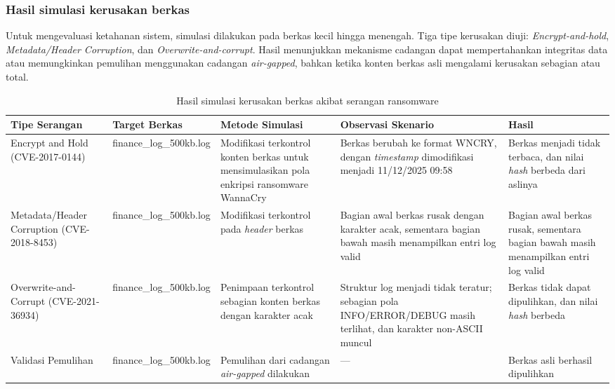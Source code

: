 \documentclass{iaesarticle}
\begin{document}
\subsubsection{Hasil simulasi kerusakan berkas}
Untuk mengevaluasi ketahanan sistem, simulasi dilakukan pada berkas kecil hingga menengah. Tiga tipe kerusakan diuji: \textit{Encrypt-and-hold}, \textit{Metadata/Header Corruption}, dan \textit{Overwrite-and-corrupt}. Hasil menunjukkan mekanisme cadangan dapat mempertahankan integritas data atau memungkinkan pemulihan menggunakan cadangan \textit{air-gapped}, bahkan ketika konten berkas asli mengalami kerusakan sebagian atau total.

\begin{table}[H]
\centering
\fontsize{8pt}{10pt}\selectfont
\caption{Hasil simulasi kerusakan berkas akibat serangan ransomware}
\label{tab:damage_simulation}
\begin{tabularx}{\textwidth}{@{}>{\raggedright\arraybackslash}p{2.2cm} >{\raggedright\arraybackslash}p{1.9cm} >{\raggedright\arraybackslash}X >{\raggedright\arraybackslash}X >{\raggedright\arraybackslash}X@{}}
\hline
\textbf{Tipe Serangan} & \textbf{Target Berkas} & \textbf{Metode Simulasi} & \textbf{Observasi Skenario} & \textbf{Hasil} \\
\hline
Encrypt and Hold (CVE-2017-0144) & finance\_\-log\_\-500kb.log & Modifikasi terkontrol konten berkas untuk mensimulasikan pola enkripsi ransomware WannaCry & Berkas berubah ke format WNCRY, dengan \textit{timestamp} dimodifikasi menjadi 11/12/2025 09:58 & Berkas menjadi tidak terbaca, dan nilai \textit{hash} berbeda dari aslinya \\
Metadata/Header Corruption (CVE-2018-8453) & finance\_\-log\_\-500kb.log & Modifikasi terkontrol pada \textit{header} berkas & Bagian awal berkas rusak dengan karakter acak, sementara bagian bawah masih menampilkan entri log valid & Bagian awal berkas rusak, sementara bagian bawah masih menampilkan entri log valid \\
Overwrite-and-Corrupt (CVE-2021-36934) & finance\_\-log\_\-500kb.log & Penimpaan terkontrol sebagian konten berkas dengan karakter acak & Struktur log menjadi tidak teratur; sebagian pola INFO/ERROR/DEBUG masih terlihat, dan karakter non-ASCII muncul & Berkas tidak dapat dipulihkan, dan nilai \textit{hash} berbeda \\
Validasi Pemulihan & finance\_\-log\_\-500kb.log & Pemulihan dari cadangan \textit{air-gapped} dilakukan & --- & Berkas asli berhasil dipulihkan \\
\hline
\end{tabularx}
\end{table}
\end{document}
